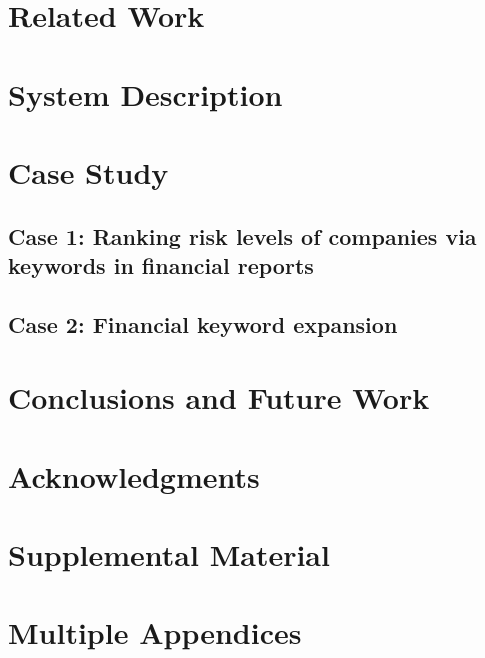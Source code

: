 \documentclass[11pt]{article}
\begin{document}
\section{Related Work}

\section{System Description}


\section{Case Study}
\subsection{Case 1: Ranking risk levels of companies via keywords in financial reports}
\subsection{Case 2: Financial keyword expansion}
\section{Conclusions and Future Work}

\section*{Acknowledgments}





\appendix
\section{Supplemental Material} \label{sec:supplemental}
\section{Multiple Appendices}
\end{document}
